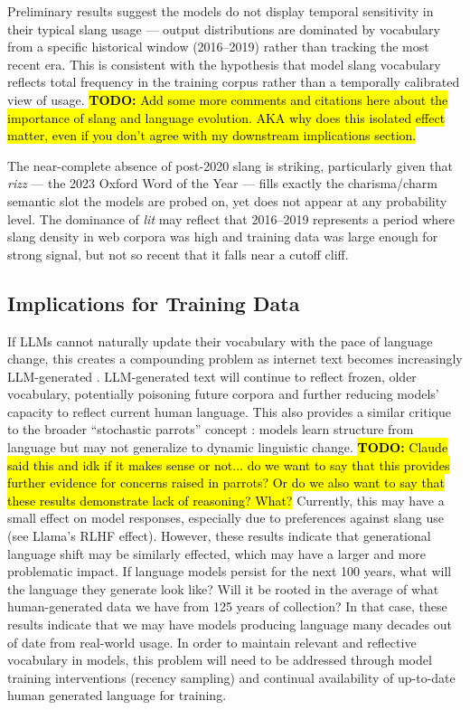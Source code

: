 \documentclass[11pt]{article}
\newcommand{\todo}[1]{\hl{\textbf{TODO:} #1}}
\begin{document}
Preliminary results suggest the models do not display temporal sensitivity in their typical slang usage --- output distributions are dominated by vocabulary from a specific historical window (2016--2019) rather than tracking the most recent era. This is consistent with the hypothesis that model slang vocabulary reflects  total frequency in the training corpus rather than a temporally calibrated view of usage. \todo{Add some more comments and citations here about the importance of slang and language evolution. AKA why does this isolated effect matter, even if you don't agree with my downstream implications section.}

The near-complete absence of post-2020 slang is striking, particularly given that \textit{rizz} --- the 2023 Oxford Word of the Year --- fills exactly the charisma/charm semantic slot the models are probed on, yet does not appear at any probability level. The dominance of \textit{lit} may reflect that 2016--2019 represents a period where slang density in web corpora was high and training data was large enough for strong signal, but not so recent that it falls near a cutoff cliff.

\subsection{Implications for Training Data}

If LLMs cannot naturally update their vocabulary with the pace of language change, this creates a compounding problem as internet text becomes increasingly LLM-generated \citep{shumailov2023curse}. LLM-generated text will continue to reflect frozen, older vocabulary, potentially poisoning future corpora and further reducing models' capacity to reflect current human language. This also provides a similar critique to the broader ``stochastic parrots'' concept \citep{bender2021parrots}: models learn structure from language but may not generalize to dynamic linguistic change. \todo{Claude said this and idk if it makes sense or not... do we want to say that this provides further evidence for concerns raised in parrots? Or do we also want to say that these results demonstrate lack of reasoning? What?} Currently, this may have a small effect on model responses, especially due to preferences against slang use (see Llama's RLHF effect).
However, these results indicate that generational language shift may be similarly effected, which may have a larger and more problematic impact. If language models persist for the next 100 years, what will the language they generate look like? Will it be rooted in the average of what human-generated data we have from 125 years of collection? In that case, these results indicate that we may have models producing language many decades out of date from real-world usage. In order to maintain relevant and reflective vocabulary in models, this problem will need to be addressed through model training interventions (recency sampling) and continual availability of up-to-date human generated language for training.
\end{document}
